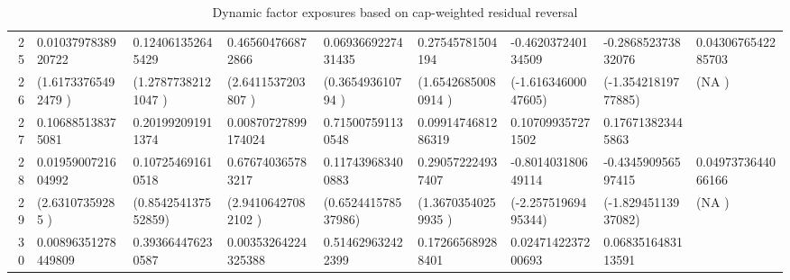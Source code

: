 \begin{table}[ht]
\begin{tabular}{rllllllll}
  25 & 0.0103797838920722 & 0.124061352645429 & 0.465604766872866 & 0.0693669227431435 & 0.27545781504194 & -0.462037240134509 & -0.286852373832076 & 0.0430676542285703 \\ 
  26 & (1.61733765492479 ) & (1.27877382121047 ) & (2.6411537203807  ) & (0.365493610794   ) & (1.65426850080914 ) & (-1.61634600047605) & (-1.35421819777885) & (NA               ) \\ 
  27 & 0.106885138375081 & 0.201992091911374 & 0.00870727899174024 & 0.715007591130548 & 0.0991474681286319 & 0.107099357271502 & 0.176713823445863 &  \\ 
  28 & 0.0195900721604992 & 0.107254691610518 & 0.676740365783217 & 0.117439683400883 & 0.290572224937407 & -0.801403180649114 & -0.434590956597415 & 0.0497373644066166 \\ 
  29 & (2.63107359285    ) & (0.854254137552859) & (2.94106427082102 ) & (0.652441578537986) & (1.36703540259935 ) & (-2.25751969495344) & (-1.82945113937082) & (NA               ) \\ 
  30 & 0.00896351278449809 & 0.393664476230587 & 0.00353264224325388 & 0.514629632422399 & 0.172665689288401 & 0.0247142237200693 & 0.0683516483113591 &  \\ 
   \hline
\end{tabular}
\caption{Dynamic factor exposures based on cap-weighted residual reversal} 
\label{tab:ParmResRevCap}
\end{table}
